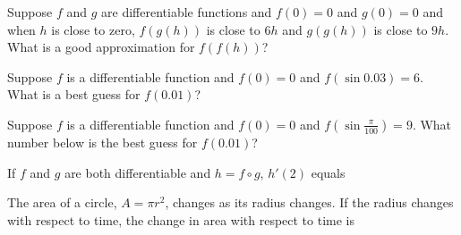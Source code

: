 \documentclass{ximera}
\newcommand{\recommendation}[1]{}
\newcommand{\GoodQuestions}[1]{}
\begin{document}
\begin{problem}
  Suppose $f$ and $g$ are differentiable functions and $f(0) = 0$ and
  $g(0) = 0$ and when $h$ is close to zero, $f(g(h))$ is close to $6h$
  and $g(g(h))$ is close to $9h$.  What is a good approximation for $f(f(h))$?
  \begin{multipleChoice}
  \end{multipleChoice}
\end{problem}

\begin{problem}
  Suppose $f$ is a differentiable function and $f(0) = 0$ and
  $f(\sin 0.03) = 6$.  What is a best guess for $f(0.01)$?
  \begin{multipleChoice}
  \end{multipleChoice}
\end{problem}

\begin{problem}
  Suppose $f$ is a differentiable function and $f(0) = 0$ and
  $f(\sin \frac{\pi}{100}) = 9$.  What number below is the best guess for $f(0.01)$?
  \begin{multipleChoice}
  \end{multipleChoice}
\end{problem}



\begin{problem}
  \recommendation{Vic}

  \GoodQuestions{Subject: Derivative Rules 19Q}
  If $f$ and $g$ are both differentiable and $h=f\circ g$,
  $h'(2)$ equals
  \begin{multipleChoice}
  \end{multipleChoice}
\end{problem}


\begin{problem}
  \recommendation{Vic}

  \GoodQuestions{Subject: Derivative Rules 20P}
  The area of a circle, $A=\pi r^2$, changes as its radius changes. If
  the radius changes with respect to time, the change in area with
  respect to time is
  \begin{multipleChoice}
  \end{multipleChoice}
\end{problem}
\end{document}
